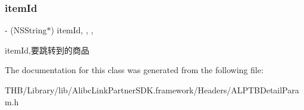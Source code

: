 \subsubsection{\texorpdfstring{item\+Id}{itemId}}
{\footnotesize\ttfamily -\/ (N\+S\+String$\ast$) item\+Id\hspace{0.3cm}{\ttfamily [read]}, {\ttfamily [write]}, {\ttfamily [nonatomic]}, {\ttfamily [strong]}}

item\+Id,要跳转到的商品 

The documentation for this class was generated from the following file\+:\begin{DoxyCompactItemize}
\item 
T\+H\+B/\+Library/lib/\+Alibc\+Link\+Partner\+S\+D\+K.\+framework/\+Headers/A\+L\+P\+T\+B\+Detail\+Param.\+h\end{DoxyCompactItemize}
